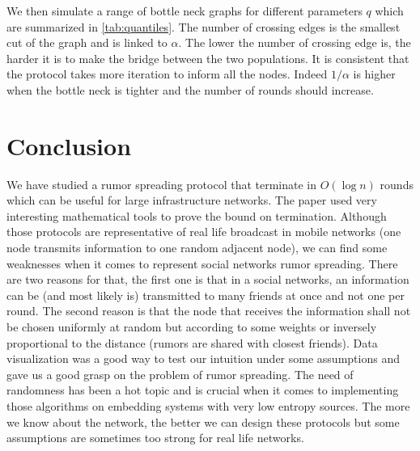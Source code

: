 \documentclass[10pt,journal,a4paper]{IEEEtran}
\begin{document}
We then simulate a range of bottle neck graphs for different parameters $q$ which are summarized in \cref{tab:quantiles}. The number of crossing edges is the smallest cut of the graph and is linked to $\alpha$. The lower the number of crossing edge is, the harder it is to make the bridge between the two populations. It is consistent that the protocol takes more iteration to inform all the nodes. Indeed $1/\alpha$ is higher when the bottle neck is tighter and the number of rounds should increase. 

\section{Conclusion}

We have studied a rumor spreading protocol that terminate in $O(\log n)$ rounds which can be useful for large infrastructure networks. The paper used very interesting mathematical tools to prove the bound on termination. Although those protocols are representative of real life broadcast in mobile networks (one node transmits information to one random adjacent node), we can find some weaknesses when it comes to represent social networks rumor spreading. There are two reasons for that, the first one is that in a social networks, an information can be (and most likely is) transmitted to many friends at once and not one per round. The second reason is that the node that receives the information shall not be chosen uniformly at random but according to some weights or inversely proportional to the distance (rumors are shared with closest friends). Data visualization was a good way to test our intuition under some assumptions and gave us a good grasp on the problem of rumor spreading. The need of randomness has been a hot topic and is crucial when it comes to implementing those algorithms on embedding systems with very low entropy sources. The more we know about the network, the better we can design these protocols but some assumptions are sometimes too strong for real life networks. 

\end{document}
